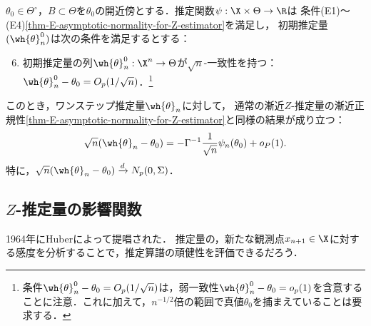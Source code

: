 \documentclass[uplatex,dvipdfmx]{jsreport}
\begin{document}
\begin{theorem}[ワンステップ推定量が漸近正規であるための十分条件]
    $\theta_0\in\Theta^\circ$，$B\subset\Theta$を$\theta_0$の開近傍とする．推定関数$\psi:\X\times\Theta\to\R$は
    条件(E1)〜(E4)\ref{thm-E-asymptotic-normality-for-Z-estimator}を満足し，
    初期推定量$(\wh{\theta}^0_n)$は次の条件を満足するとする：
    \begin{enumerate}[({E}1)]\setcounter{enumi}{5}
        \item 初期推定量の列$\wh{\theta}^0_n:\X^n\to\Theta$が$\sqrt{n}$-一致性を持つ：$\wh{\theta}^0_n-\theta_0=O_p(1/\sqrt{n})$．\footnote{条件$\wh{\theta}^0_n-\theta_0=O_p(1/\sqrt{n})$は，弱一致性$\wh{\theta}^0_n-\theta_0=o_p(1)$を含意することに注意．これに加えて，$n^{-1/2}$倍の範囲で真値$\theta_0$を捕まえていることは要求する．}
    \end{enumerate}
    このとき，ワンステップ推定量$\wh{\theta}_n$に対して，
    通常の漸近$Z$-推定量の漸近正規性\ref{thm-E-asymptotic-normality-for-Z-estimator}と同様の結果が成り立つ：
    \[\sqrt{n}(\wh{\theta}_n-\theta_0)=-\Gamma^{-1}\frac{1}{\sqrt{n}}\psi_n(\theta_0)+o_P(1).\]
    特に，$\sqrt{n}(\wh{\theta}_n-\theta_0)\xrightarrow{d}N_p(0,\Sigma)$．
\end{theorem}

\subsection{$Z$-推定量の影響関数}

\begin{tcolorbox}[colframe=ForestGreen, colback=ForestGreen!10!white,breakable,colbacktitle=ForestGreen!40!white,coltitle=black,fonttitle=\bfseries\sffamily,
title=]
    1964年にHuberによって提唱された．
    推定量の，新たな観測点$x_{n+1}\in\X$に対する感度を分析することで，推定算譜の頑健性を評価できるだろう．
\end{tcolorbox}
\end{document}
